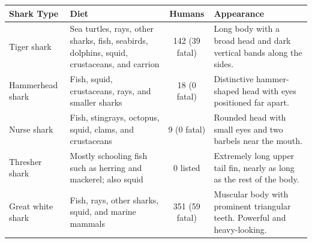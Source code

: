\documentclass[openany]{book}
\begin{document}
    


\begin{center}
    \begin{tabular}{|l|p{5cm}|c|p{6cm}|}
    \hline
    \textbf{Shark Type} &
    \textbf{Diet} &
    \textbf{Humans} &
    \textbf{Appearance} \\ \hline
    
    Tiger shark &
    Sea turtles, rays, other sharks, fish, seabirds, dolphins,
    squid, crustaceans, and carrion &
    142 (39 fatal)& Long body with a broad head and dark vertical bands
    along the sides.
     \\ \hline
    
    Hammerhead shark &
    Fish, squid, crustaceans, rays, and smaller sharks &
    18 (0 fatal) &
    Distinctive hammer-shaped head with eyes positioned far apart.
    \\ \hline
    
    Nurse shark &
    Fish, stingrays, octopus, squid, clams, and crustaceans &
    9 (0 fatal)&
    Rounded head with small eyes and two barbels near the mouth.
    \\ \hline
    
    Thresher shark &
    Mostly schooling fish such as herring and mackerel; also squid &
    0 listed &
    Extremely long upper tail fin,
    nearly as long as the rest of the body. \\ \hline
    
    Great white shark &
    Fish, rays, other sharks, squid, and marine mammals &
    351 (59 fatal)&
    Muscular body with prominent
    triangular teeth. Powerful and heavy-looking.\\ \hline
    
    \end{tabular}
    \end{center}
\end{document}
